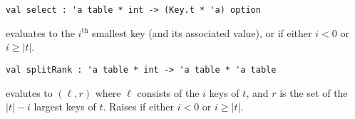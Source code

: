\begin{cluster}
\label{grp:grm:ordtable-interface::select}

\begin{gram}[select]
\label{grm:ordtable-interface::select}
\begin{verbatim}
val select : 'a table * int -> (Key.t * 'a) option
\end{verbatim}
 evaluates to the $i^\text{th}$ smallest key (and its
associated value), or  if either $i < 0$ or $i \geq |t|$.

\end{gram}
\end{cluster}

\begin{cluster}
\label{grp:grm:ordtable-interface::splitrank}

\begin{gram}[splitRank]
\label{grm:ordtable-interface::splitrank}
\begin{verbatim}
val splitRank : 'a table * int -> 'a table * 'a table
\end{verbatim}
 evalutes to $(\ell,r)$ where $\ell$ consists of the $i$
keys of $t$, and $r$ is the set of the $|t|-i$ largest
keys of $t$. Raises  if either $i < 0$ or $i \geq |t|$.

\end{gram}
\end{cluster}

